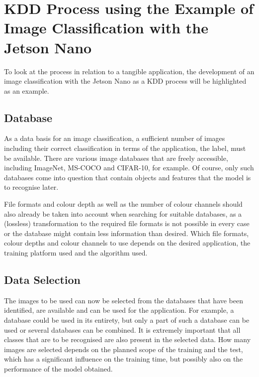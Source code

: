 \section{KDD Process using the Example of Image Classification with the Jetson Nano} \label{ExampleKDD}

To look at the process in relation to a tangible application, the development of an image classification with the Jetson Nano as a KDD process will be highlighted as an example.

\subsection{Database}


As a data basis for an image classification, a sufficient number of images including their correct classification in terms of the application, the label, must be available. There are various image databases that are freely accessible, including ImageNet, MS-COCO and CIFAR-10, for example. Of course, only such databases come into question that contain objects and features that the model is to recognise later. \cite{Deng:2009,Deng:2012,Schutten:2016,Agarap:2018b} 

File formats and colour depth as well as the number of colour channels should also already be taken into account when searching for suitable databases, as a (lossless) transformation to the required file formats is not possible in every case or the database might contain less information than desired. Which file formats, colour depths and colour channels to use depends on the desired application, the training platform used and the algorithm used.

\subsection{Data Selection}

The images to be used can now be selected from the databases that have been identified, are available and can be used for the application. For example, a database could be used in its entirety, but only a part of such a database can be used or several databases can be combined. It is extremely important that all classes that are to be recognised are also present in the selected data. How many images are selected depends on the planned scope of the training and the test, which has a significant influence on the training time, but possibly also on the performance of the model obtained. 


